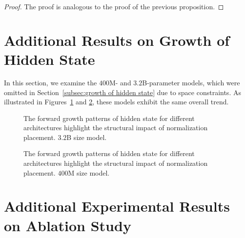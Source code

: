 \begin{proof}
The proof is analogous to the proof of the previous proposition.
\end{proof}


\newpage
\section{Additional Results on Growth of Hidden State}
In this section, we examine the $400$M- and $3.2$B-parameter models, which were omitted in Section~\ref{subsec:growth of hidden state} due to space constraints. As illustrated in Figures~\ref{fig:growth_of_hidden_state_3B} and \ref{fig:growth_of_hidden_state_400M}, these models exhibit the same overall trend.

\begin{figure}[ht!]
    \centering
    \caption{The forward growth patterns of hidden state for different architectures highlight the structural impact of normalization placement. $3.2$B size model.}
    \label{fig:growth_of_hidden_state_3B}
\end{figure}

\begin{figure}[ht!]
    \centering
    \caption{The forward growth patterns of hidden state for different architectures highlight the structural impact of normalization placement. $400$M size model.}
    \label{fig:growth_of_hidden_state_400M}
\end{figure}



\newpage
\section{Additional Experimental Results on Ablation Study} \label{appendix:additionalresults}

